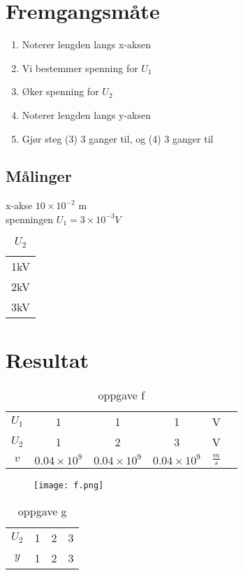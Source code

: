 \documentclass[a4paper]{article}
\begin{document}
\section{Fremgangsmåte} %
\label{sec:fremgangsmåte}
\begin{enumerate}
	\item Noterer lengden langs x-aksen
	\item Vi bestemmer spenning for $U_1$
	\item Øker spenning for $U_2$
	\item Noterer lengden langs y-aksen
	\item Gjør steg (3) 3 ganger til, og (4) 3 ganger til
\end{enumerate}
\subsection{Målinger} %
\label{sub:målinger}
x-akse $10\times 10^{-2}$ m \\
spenningen $U_1 = 3 \times 10^{-3} V$
\begin{table}[htpb]
	\centering
	\caption{$U_2$}
	\label{tab:label}
	\begin{tabular}{c}
		1kV \\
		2kV \\
		3kV \\
	\end{tabular}
\end{table}
\newpage
\section{Resultat} %
\label{sec:resultat}
\begin{table}[htpb]
	\centering
	\caption{oppgave f}
	\label{tab:label}
	\begin{tabular}{| c | c | c | c | c | c}
		$U_1$ & 1 & 1 & 1 & V\\
		$U_2$ & 1 & 2 & 3 & V\\
		$v$ & $0.04 \times 10^{9}$ & $0.04 \times 10^{9}$ &$0.04 \times 10^{9}$ & $\frac{m}{s}$ 
	\end{tabular}
\end{table}
\begin{figure}[h]
  \centering
  \texttt{[image: f.png]}
  \caption{}
  \label{fig:f.png} 
\end{figure}
\begin{table}[htpb]
	\centering
	\caption{oppgave g}
	\label{tab:label}
	\begin{tabular}{| c | c | c | c |}
		$U_2$ & 1 & 2 & 3 \\
		$y$ & 1 & 2 & 3
	\end{tabular}
\end{table}
\end{document}
